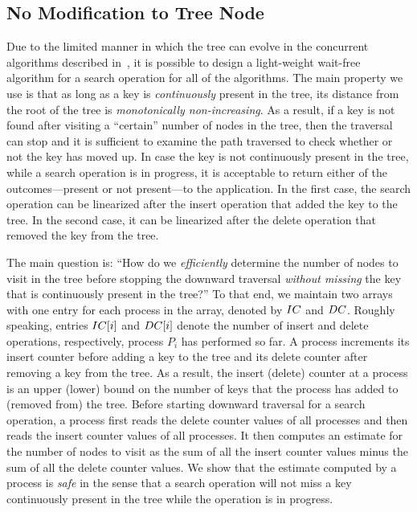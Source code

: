 \begin{limitscope}
\section{No Modification to Tree Node}
Due to the limited manner in which the tree can evolve in the concurrent algorithms described in~\cite{HowJon:2012:SPAA,DraVec+:2014:PPoPP,ArbAtt:2014:PODC,RamMit:2015:ICDCN,RamMit:2015:PPoPP}, it is possible to design a light-weight wait-free algorithm for a search operation for all of the algorithms. The main property we use is that as long as a key is \emph{continuously} present in the tree, its distance from the root of the tree is \emph{monotonically non-increasing}. As a result, if a key is not found after visiting a ``certain'' number of nodes in the tree, then the traversal can stop and it is sufficient to examine the path traversed to check whether or not the key has moved up. In case the key is not continuously present in the tree, while a search operation is in progress, it is acceptable to return either of the 
outcomes---present or not present---to the application. In the first case, the search operation can be linearized after the insert operation that added the key to the tree. In the second case, it can be linearized after the delete operation that removed the key from the tree. 

The main question is: ``How do we \emph{efficiently} determine the number of nodes to visit in the tree before stopping the downward traversal \emph{without missing} the key that is continuously present in the tree?'' To that end, we maintain two arrays with one entry for each process in the array, denoted by $IC$ and $DC$. Roughly speaking, entries $IC[i]$ and $DC[i]$ denote the number of insert and delete operations, respectively, process $P_i$ has performed so far. A process increments its insert counter before adding a key to the tree and its delete counter after removing a key from the tree. As a result, the insert (delete) counter at a process is an upper (lower) bound on the number of keys that the process has added to (removed from) the tree. Before starting downward traversal for a search operation, a process first reads the delete counter values of all processes and then reads the insert counter values of all processes. It then computes an estimate for the number of nodes to visit as the sum of all the insert counter values minus the sum of all the delete counter values. We show that the estimate computed by a process is \emph{safe} in the sense that a search operation will not miss a key continuously present in the tree while the operation is in progress.


\end{limitscope}
